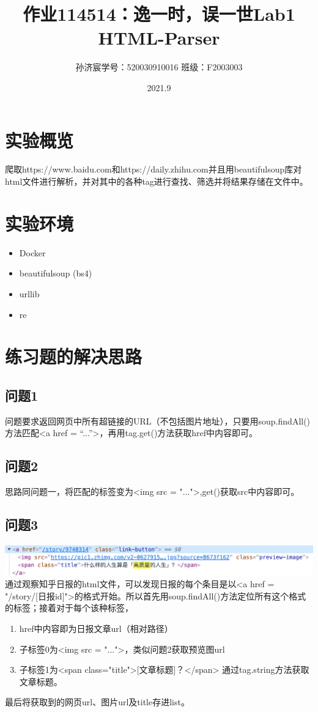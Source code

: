 \documentclass[12pt,a4paper]{article}
\title{作业114514：逸一时，误一世}
\title{Lab1 HTML-Parser}
\date{2021.9}
\author{孙济宸\quad 学号：520030910016 \quad 班级：F2003003}
\begin{document}
\maketitle
\section{实验概览}
爬取https://www.baidu.com和https://daily.zhihu.com并且用beautifulsoup库对html文件进行解析，并对其中的各种tag进行查找、筛选并将结果存储在文件中。
\section{实验环境}
\begin{itemize}
	\item Docker
	\item beautifulsoup (bs4)
	\item urllib
	\item re
\end{itemize}
\section{练习题的解决思路}
\subsection{问题1}
问题要求返回网页中所有超链接的URL（不包括图片地址），只要用soup.findAll()方法匹配<a href = “...”>，再用tag.get()方法获取href中内容即可。
\subsection{问题2}
思路同问题一，将匹配的标签变为<img src = "...">,get()获取src中内容即可。
\subsection{问题3}
\includegraphics[scale=0.6]{img1.png} \\
通过观察知乎日报的html文件，可以发现日报的每个条目是以<a href = "/story/[日报id]">的格式开始。所以首先用soup.findAll()方法定位所有这个格式的标签；接着对于每个该种标签，
\begin{enumerate}
	\item href中内容即为日报文章url（相对路径）
	\item 子标签0为<img src = "...">，类似问题2获取预览图url
	\item 子标签1为<span class="title">[文章标题]？</span> 通过tag.string方法获取文章标题。
\end{enumerate}
最后将获取到的网页url、图片url及title存进list。
\end{document}
